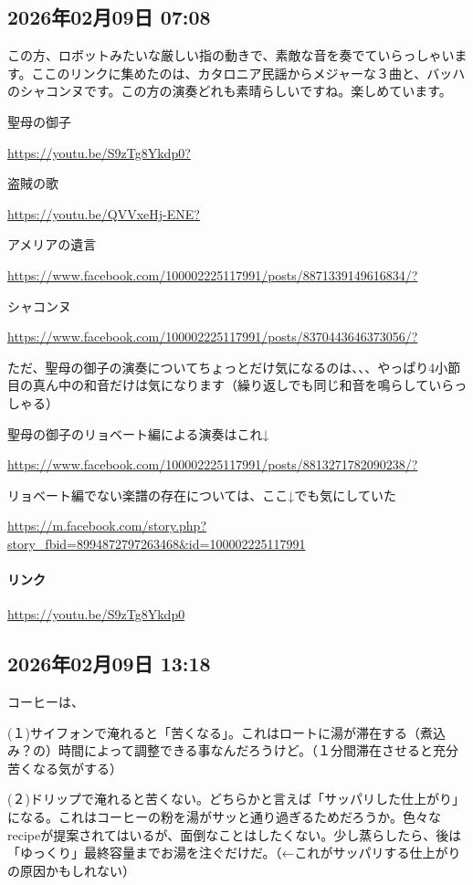 \subsection*{2026年02月09日 07:08}

この方、ロボットみたいな厳しい指の動きで、素敵な音を奏でていらっしゃいます。ここのリンクに集めたのは、カタロニア民謡からメジャーな３曲と、バッハのシャコンヌです。この方の演奏どれも素晴らしいですね。楽しめています。

聖母の御子

\url{https://youtu.be/S9zTg8Ykdp0?}

盗賊の歌

\url{https://youtu.be/QVVxeHj-ENE?}

アメリアの遺言

\url{https://www.facebook.com/100002225117991/posts/8871339149616834/?}

シャコンヌ

\url{https://www.facebook.com/100002225117991/posts/8370443646373056/?}

ただ、聖母の御子の演奏についてちょっとだけ気になるのは、、、やっぱり4小節目の真ん中の和音だけは気になります（繰り返しでも同じ和音を鳴らしていらっしゃる）

聖母の御子のリョベート編による演奏はこれ↓

\url{https://www.facebook.com/100002225117991/posts/8813271782090238/?}

リョベート編でない楽譜の存在については、ここ↓でも気にしていた

\url{https://m.facebook.com/story.php?story_fbid=8994872797263468&id=100002225117991}

\paragraph{リンク}
\url{https://youtu.be/S9zTg8Ykdp0}

\subsection*{2026年02月09日 13:18}

コーヒーは、

(１)サイフォンで淹れると「苦くなる」。これはロートに湯が滞在する（煮込み？の）時間によって調整できる事なんだろうけど。（１分間滞在させると充分苦くなる気がする）

(２)ドリップで淹れると苦くない。どちらかと言えば「サッパリした仕上がり」になる。これはコーヒーの粉を湯がサッと通り過ぎるためだろうか。色々なrecipeが提案されてはいるが、面倒なことはしたくない。少し蒸らしたら、後は「ゆっくり」最終容量までお湯を注ぐだけだ。（←これがサッパリする仕上がりの原因かもしれない）

